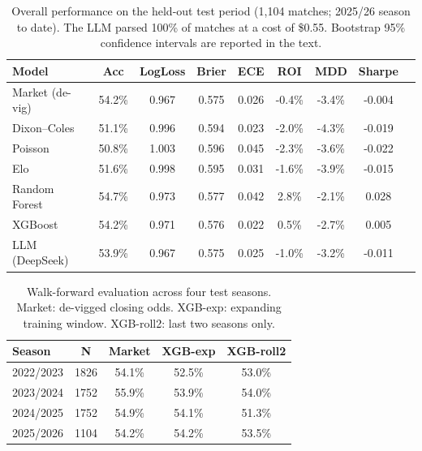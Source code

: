 \documentclass[10pt]{article}
\begin{document}
\begin{table}[htbp]
\centering
\caption{Overall performance on the held-out test period (1{,}104 matches;
2025/26 season to date). The LLM parsed 100\% of matches at a cost of \$0.55.
Bootstrap 95\% confidence intervals are reported in the text.}
\label{tab:overall}
\begin{tabular}{lcccccccc}
\toprule
Model & Acc & LogLoss & Brier & ECE & ROI & MDD & Sharpe \\
\midrule
Market (de-vig) & 54.2\% & 0.967 & 0.575 & 0.026 & -0.4\% & -3.4\% & -0.004 \\
Dixon--Coles & 51.1\% & 0.996 & 0.594 & 0.023 & -2.0\% & -4.3\% & -0.019 \\
Poisson & 50.8\% & 1.003 & 0.596 & 0.045 & -2.3\% & -3.6\% & -0.022 \\
Elo & 51.6\% & 0.998 & 0.595 & 0.031 & -1.6\% & -3.9\% & -0.015 \\
Random Forest & 54.7\% & 0.973 & 0.577 & 0.042 & 2.8\% & -2.1\% & 0.028 \\
XGBoost & 54.2\% & 0.971 & 0.576 & 0.022 & 0.5\% & -2.7\% & 0.005 \\
LLM (DeepSeek) & 53.9\% & 0.967 & 0.575 & 0.025 & -1.0\% & -3.2\% & -0.011 \\
\bottomrule
\end{tabular}
\end{table}

\begin{table}[htbp]
\centering
\caption{Walk-forward evaluation across four test seasons. Market: de-vigged
closing odds. XGB-exp: expanding training window. XGB-roll2: last two seasons
only.}
\label{tab:walkforward}
\small
\begin{tabular}{lcccc}
\toprule
Season & N & Market & XGB-exp & XGB-roll2 \\
\midrule
2022/2023 & 1826 & 54.1\% & 52.5\% & 53.0\% \\
2023/2024 & 1752 & 55.9\% & 53.9\% & 54.0\% \\
2024/2025 & 1752 & 54.9\% & 54.1\% & 51.3\% \\
2025/2026 & 1104 & 54.2\% & 54.2\% & 53.5\% \\
\bottomrule
\end{tabular}
\end{table}
\end{document}
